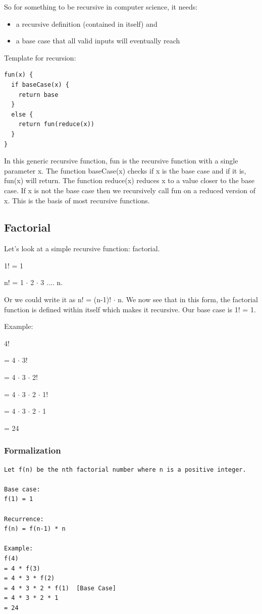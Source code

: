 \documentclass[11pt,oneside]{book}
\begin{document}
So for something to be recursive in computer science, it needs:

\begin{itemize}
\item a recursive definition (contained in itself) and 
\item a base case that all valid inputs will eventually reach
\end{itemize}

Template for recursion:

\begin{lstlisting}
fun(x) {
  if baseCase(x) {
    return base
  }
  else {
    return fun(reduce(x))
  }
}
\end{lstlisting}

In this generic recursive function, fun is the recursive function with a single parameter x. The function baseCase(x) checks if x is the base case and if it is, fun(x) will return. The function reduce(x) reduces x to a value closer to the base case. If x is not the base case then we recursively call fun on a reduced version of x. This is the basis of most recursive functions.

\subsection{Factorial}

Let's look at a simple recursive function: factorial.

1! = 1

n! = 1 $\cdot$ 2 $\cdot$ 3 .... n.

Or we could write it as n! = (n-1)! $\cdot$ n. We now see that in this form, the factorial function is defined within itself which makes it recursive. Our base case is 1! = 1.

Example:

4!

= 4 $\cdot$ 3!

= 4 $\cdot$ 3 $\cdot$ 2!

= 4 $\cdot$ 3 $\cdot$ 2 $\cdot$ 1!

= 4 $\cdot$ 3 $\cdot$ 2 $\cdot$ 1

= 24

\subsubsection{Formalization}

\begin{lstlisting}
Let f(n) be the nth factorial number where n is a positive integer.

Base case:
f(1) = 1

Recurrence:
f(n) = f(n-1) * n

Example:
f(4) 
= 4 * f(3)
= 4 * 3 * f(2)
= 4 * 3 * 2 * f(1)  [Base Case]
= 4 * 3 * 2 * 1
= 24
\end{lstlisting}
\end{document}
